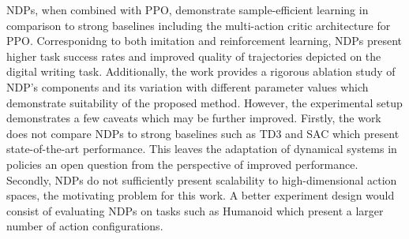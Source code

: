 \documentclass[11pt,letterpaper]{article}
\begin{document}
NDPs, when combined with PPO, demonstrate sample-efficient learning in comparison to strong baselines including the multi-action critic architecture for PPO. Corresponidng to both imitation and reinforcement learning, NDPs present higher task success rates and improved quality of trajectories depicted on the digital writing task. Additionally, the work provides a rigorous ablation study of NDP's components and its variation with different parameter values which demonstrate suitability of the proposed method. However, the experimental setup demonstrates a few caveats which may be further improved. Firstly, the work does not compare NDPs to strong baselines such as TD3 and SAC which present state-of-the-art performance. This leaves the adaptation of dynamical systems in policies an open question from the perspective of improved performance. Secondly, NDPs do not sufficiently present scalability to high-dimensional action spaces, the motivating problem for this work. A better experiment design would consist of evaluating NDPs on tasks such as Humanoid which present a larger number of action configurations. 
\end{document}
